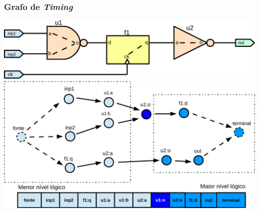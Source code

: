 \documentclass[10pt,a4paper]{beamer}
\begin{document}
		\begin{frame}[t]
			\frametitle{Grafo de \textit{Timing}}
			\begin{center}
				\includegraphics[width=0.7\linewidth]{img/exemplo_circuito_simple.pdf} \\\vspace{0.5cm} 
				\includegraphics[width=0.8\linewidth]{img/grafo_lista_nivel_logico.pdf}
			\end{center}
		\end{frame}
\end{document}
